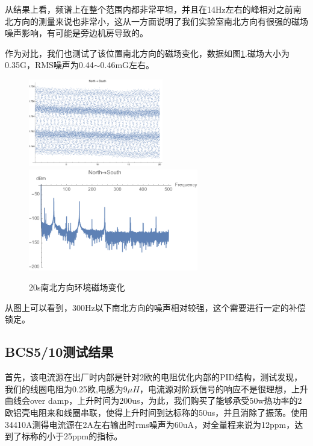 \documentclass[onecolumn,a4paper,10pt]{article}
\begin{document}
从结果上看，频谱上在整个范围内都非常平坦，并且在14Hz左右的峰相对之前南北方向的测量来说也非常小，这从一方面说明了我们实验室南北方向有很强的磁场噪声影响，有可能是旁边机房导致的。

作为对比，我们也测试了该位置南北方向的磁场变化，数据如图\ref{fig:1090}.磁场大小为0.35G，RMS噪声为0.44$\sim$0.46mG左右。

\begin{figure}[htbp]
\centering
\includegraphics[height=1.5in]{SNDATA}%
\hspace{0.4in}%
\includegraphics[height=1.75in]{FourierSNDATA}
\caption{20s南北方向环境磁场变化}
\label{fig:1090}
\end{figure}

从图上可以看到，300Hz以下南北方向的噪声相对较强，这个需要进行一定的补偿锁定。

\subsection{BCS5/10测试结果}

首先，该电流源在出厂时内部是针对2欧的电阻优化内部的PID结构，测试发现，我们的线圈电阻为0.25欧,电感为9$\mu H$，电流源对阶跃信号的响应不是很理想，上升曲线会over damp，上升时间为200us，为此，我们购买了能够承受50w热功率的2欧铝壳电阻来和线圈串联，使得上升时间到达标称的50us，并且消除了振荡。使用34410A测得电流源在2A左右输出时rms噪声为60uA，对全量程来说为12ppm，达到了标称的小于25ppm的指标。
\end{document}
